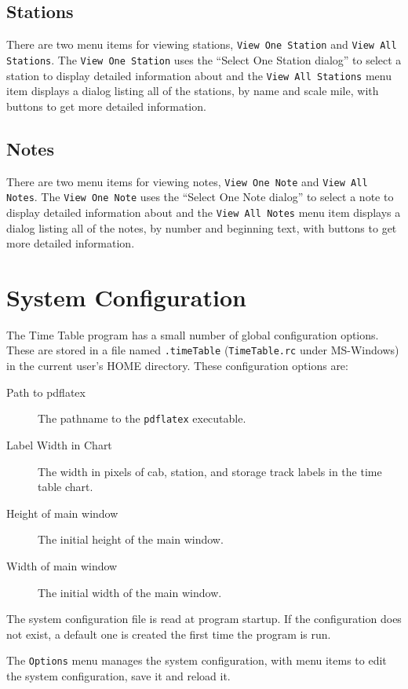 \subsection{Stations}
\label{sect:tt:ViewingStations}

There are two menu items for viewing stations, \texttt{View One
Station} and \texttt{View All Stations}.  The \texttt{View One Station}
uses the ``Select One Station dialog'' to select a station to display
detailed information about and the \texttt{View All Stations} menu item
displays a dialog listing all of the stations, by name and scale mile, with
buttons to get more detailed information.

\subsection{Notes}
\label{sect:tt:ViewingNotes}

There are two menu items for viewing notes, \texttt{View One Note} and
\texttt{View All Notes}.  The \texttt{View One Note} uses the ``Select
One Note dialog'' to select a note to display detailed information
about and the \texttt{View All Notes} menu item displays a dialog
listing all of the notes, by number and beginning text, with buttons to
get more detailed information.

\section{System Configuration}

The Time Table program has a small number of global
configuration options.  These are stored in a file named
\texttt{.timeTable} (\texttt{TimeTable.rc} under MS-Windows) in the
current user's HOME directory.  These configuration options are:
\begin{description}
\item [Path to pdflatex] The pathname to the \texttt{pdflatex}
executable.
\item [Label Width in Chart] The width in pixels of cab, station, and
storage track labels in the time table chart.
\item [Height of main window] The initial height of the main window.
\item [Width of main window] The initial width of the main window.
\end{description}

The system configuration file is read at program startup.  If the
configuration does not exist, a default one is created the first time
the program is run.

The \texttt{Options} menu manages the system configuration, with menu
items to edit the system configuration, save it and reload it.

